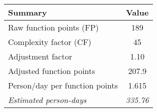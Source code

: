 \begin{tabular}{l|c}
\textbf{Summary} & \textbf{Value} \\ \hline
Raw function points (FP) & 189 \\
Complexity factor (CF) & 45 \\
Adjustment factor & 1.10 \\
Adjusted function points & 207.9 \\
Person/day per function points & 1.615 \\ \hline
\textit{Estimated person-days} & \textit{335.76}
\end{tabular}
